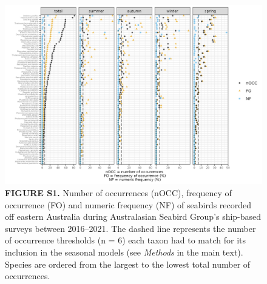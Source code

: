 \documentclass[
]{article}
\begin{document}
\begin{landscape}
\newpage

\begin{figure}
\centering
\includegraphics{../results/FigS1_spp-nOCC-FO-NF-seasons.png}
\caption{\textbf{FIGURE S1.} Number of occurrences (nOCC), frequency of
occurrence (FO) and numeric frequency (NF) of seabirds recorded off
eastern Australia during Australasian Seabird Group's ship-based surveys
between 2016--2021. The dashed line represents the number of occurrence
thresholds (n = 6) each taxon had to match for its inclusion in the
seasonal models (see \emph{Methods} in the main text). Species are
ordered from the largest to the lowest total number of occurrences.}
\end{figure}

\end{landscape}

\newpage
\end{document}
